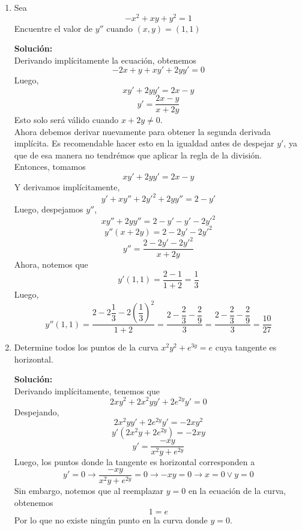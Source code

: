 \documentclass[12pt]{article}
\newenvironment{solucion}
{\begin{mdframed}[backgroundcolor=black!10]
		{\bf Solución:}\\
	}
	{
	\end{mdframed}
}
\newenvironment{preguntas}
{\begin{enumerate}\itemsep12pt
	}
	{
	\end{enumerate}
}
\newcommand{\ra}{\rightarrow}
\begin{document}
\begin{preguntas}
\begin{solucion}
$$\dfrac{\delta}{\delta x} y = y'$$
En resumen, cuando estemos derivando algo que tenga un $y$ (o algo que no se este derivando en función de su misma variable), cuando hayamos terminado de derivar aplicamos el último paso de la regla de la cadena (que usualmente omitimos porque la derivada de $x$ es 1) y lo dejamos expresado como $y'$
\begin{enumerate}[a)]
\item $x^2+y^2-7=0$\\
\\
Derivamos toda la igualdad en función de $x$, esto es
$$2x + 2yy' = 0 $$
Y luego, despejamos $y'$
$$y' = -\dfrac{x}{y}$$
\item $x^2y-xy^2+y^2=4$\\
\\
Derivamos en función de $x$,
$$(x^2y)'-(xy^2)'+(y^2)'=0$$
$$2xy + x^2y'-y^2 - 2yy'x+2yy'=0$$
Dejamos todo lo que tenga $y'$ a un lado,
$$x^2y' - 2yy'x+2yy'= -2xy +y^2$$
$$y'(x^2 - 2yx+2y)= -2xy +y^2$$
Finalmente,
$$y'= \dfrac{-2xy +y^2}{x^2 - 2yx+2y}$$
\end{enumerate}
\end{solucion}
\item Sea
$$-x^2+xy+y^2=1$$
Encuentre el valor de $y''$ cuando $(x,y)=(1,1)$
\begin{solucion}
Derivando implícitamente la ecuación, obtenemos
$$-2x + y + xy' + 2yy' = 0$$
Luego,
$$xy' + 2yy' = 2x-y$$
$$y' = \dfrac{2x-y}{x+2y}$$
Esto solo será válido cuando $x+2y\neq 0$.\\

Ahora debemos derivar nuevamente para obtener la segunda derivada implícita. Es recomendable hacer esto en la igualdad antes de despejar $y'$, ya que de esa manera no tendrémos que aplicar la regla de la división. \\

Entonces, tomamos
$$xy' + 2yy' = 2x-y$$
Y derivamos implícitamente,
$$y' + xy'' + 2y'^2+2yy'' = 2 - y'$$
Luego, despejamos $y''$,
$$xy''+2yy'' = 2 - y' - y' - 2y'^2$$
$$y''(x+2y) = 2 - 2y' - 2y'^2$$
$$y'' = \dfrac{2 - 2y' - 2y'^2}{x+2y}$$
Ahora, notemos que
$$y'(1,1) = \dfrac{2-1}{1+2} = \dfrac{1}{3}$$
Luego,
$$y''(1,1) = \dfrac{2-2\dfrac{1}{3} - 2\left(\dfrac{1}{3}\right)^2}{1+2} 
= \dfrac{2-\dfrac{2}{3}-\dfrac{2}{9}}{3}
= \dfrac{2-\dfrac{2}{3}-\dfrac{2}{9}}{3}
= \dfrac{10}{27}
$$
\end{solucion}
\item Determine todos los puntos de la curva $x^2y^2 + e^{3y} = e$ cuya tangente es horizontal.
\begin{solucion}
Derivando implícitamente, tenemos que
$$2xy^2 + 2x^2yy' + 2e^{2y}y' = 0$$
Despejando,
$$2x^2yy' + 2e^{2y}y' = -2xy^2$$
$$y'(2x^2y + 2e^{2y}) = -2xy$$
$$y' = \dfrac{-xy}{x^2y + e^{2y}}$$
Luego, los puntos donde la tangente es horizontal corresponden a
$$y'= 0 \ra \dfrac{-xy}{x^2y + e^{2y}} = 0 \ra -xy = 0 \ra x = 0 \vee y = 0$$
Sin embargo, notemos que al reemplazar $y=0$ en la ecuación de la curva, obtenemos
$$1 = e$$
Por lo que no existe ningún punto en la curva donde $y=0$.\\


\end{solucion}
\end{preguntas}
\end{document}
